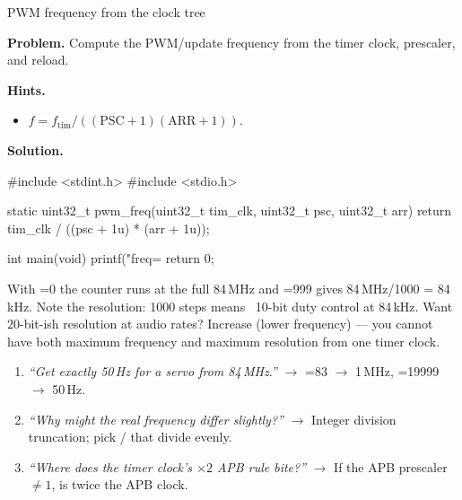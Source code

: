 \begin{gymproblem}{PWM frequency from the clock tree}

\textbf{Problem.} Compute the PWM/update frequency from the timer clock,
prescaler, and reload.

\textbf{Hints.}
\begin{itemize}
\item $f = f_{\text{tim}}/((\text{PSC}+1)(\text{ARR}+1))$.
\end{itemize}

\attempt

\textbf{Solution.}
\begin{cgym}
#include <stdint.h>
#include <stdio.h>

static uint32_t pwm_freq(uint32_t tim_clk, uint32_t psc, uint32_t arr) {
    return tim_clk / ((psc + 1u) * (arr + 1u));
}

int main(void) {
    printf("freq=%
    return 0;
}
\end{cgym}

With =0 the counter runs at the full 84\,MHz and =999 gives
84\,MHz/1000 = 84\,kHz. Note the resolution: 1000 steps means ~10-bit duty
control at 84\,kHz. Want 20-bit-ish resolution at audio rates? Increase
 (lower frequency) --- you cannot have both maximum frequency and
maximum resolution from one timer clock.

\followups
\begin{enumerate}
\item \emph{``Get exactly 50\,Hz for a servo from 84\,MHz.''} $\rightarrow$
  =83 $\rightarrow$ 1\,MHz, =19999 $\rightarrow$ 50\,Hz.
\item \emph{``Why might the real frequency differ slightly?''} $\rightarrow$
  Integer division truncation; pick / that divide evenly.
\item \emph{``Where does the timer clock's $\times2$ APB rule bite?''}
  $\rightarrow$ If the APB prescaler $\neq1$,  is twice the APB
  clock.
\end{enumerate}
\end{gymproblem}

